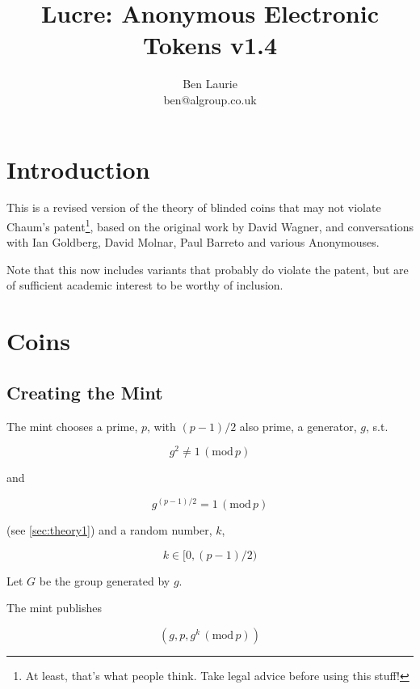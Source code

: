 \documentclass[a4paper,titlepage]{article}
\title{Lucre: Anonymous Electronic Tokens v1.4}
\author{Ben Laurie \\
ben@algroup.co.uk}
\begin{document}
\maketitle

\def\mod#1{\,(\textrm{mod}\,#1)}
\def\implies{\Rightarrow}
\def\qe#1{\begin{equation}#1\end{equation}}
\def\qearray#1{\begin{eqnarray}#1\end{eqnarray}}
\def\oneway#1{\textrm{oneway}(#1)}
\def\preoneway#1{\textrm{preoneway}(#1)}

\setlength{\parindent}{0pt}
\setlength{\parskip}{1ex plus 0.5ex minus 0.2ex}

\section{Introduction}

This is a revised version of the theory of blinded coins that may not
violate Chaum's patent\footnote{At least, that's what people
think. Take legal advice before using this stuff!}, based on the
original work by David Wagner, and conversations with Ian Goldberg,
David Molnar, Paul Barreto and various Anonymouses.

Note that this now includes variants that probably do violate the
patent, but are of sufficient academic interest to be worthy of
inclusion.

\section{Coins}

\subsection{Creating the Mint}

The mint chooses a prime, $p$, with $(p-1)/2$ also prime, a generator,
$g$, s.t.

\qe{g^2 \neq 1 \mod p}

and

\qe{\label{eq:1}g^{(p-1)/2} = 1 \mod p}

(see \ref{sec:theory1}) and a random number, $k$,

\qe{k \in [0,(p-1)/2)}

Let $G$ be the group generated by $g$.

The mint publishes

\qe{(g,p,g^k \mod p)}
\end{document}
